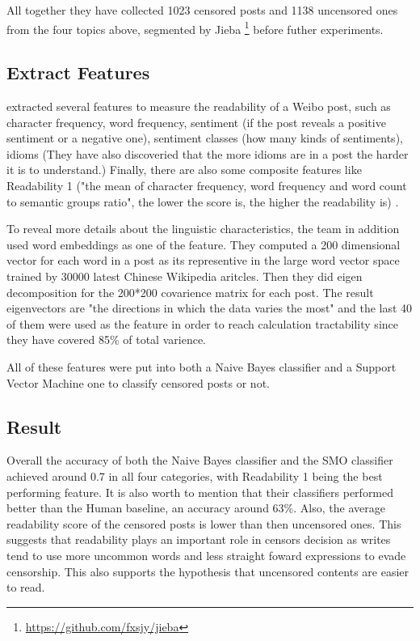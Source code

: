 \documentclass[11pt]{article} %
\begin{document}
All together they have collected 1023 censored posts and 1138 uncensored ones from the four topics above, segmented by Jieba \footnote{\url{https://github.com/fxsjy/jieba}} before futher experiments.

\subsection{Extract Features}

\cite{ng2018linguistic} extracted several features to measure the readability of a Weibo post, such as character frequency, word frequency, sentiment (if the post reveals a positive sentiment or a negative one), sentiment classes (how many kinds of sentiments), idioms (They have also discoveried that the more idioms are in a post the harder it is to understand.) Finally, there are also some composite features like Readability 1 ("the mean of character frequency, word frequency and word count to semantic groups ratio", the lower the score is, the higher the readability is) \cite{ng2018linguistic}.

To reveal more details about the linguistic characteristics, the team in addition used word embeddings as one of the feature. They computed a 200 dimensional vector for each word in a post as its representive in the large word vector space trained by 30000 latest Chinese Wikipedia aritcles. Then they did eigen decomposition for the 200*200 covarience matrix for each post. The result eigenvectors are "the directions in which the data varies the most" and the last 40 of them were used as the feature in order to reach calculation tractability since they have covered 85\% of total varience.

All of these features were put into both a Naive Bayes classifier and a Support Vector Machine one to classify censored posts or not.

\subsection{Result}

Overall the accuracy of both the Naive Bayes classifier and the SMO classifier achieved around 0.7 in all four categories, with Readability 1 being the best performing feature. It is also worth to mention that their classifiers performed better than the Human baseline, an accuracy around 63\%. Also, the average readability score of the censored posts is lower than then uncensored ones. This suggests that readability plays an important role in censors decision as writes tend to use more uncommon words and less straight foward expressions to evade censorship. This also supports the hypothesis that uncensored contents are easier to read.
\end{document}
